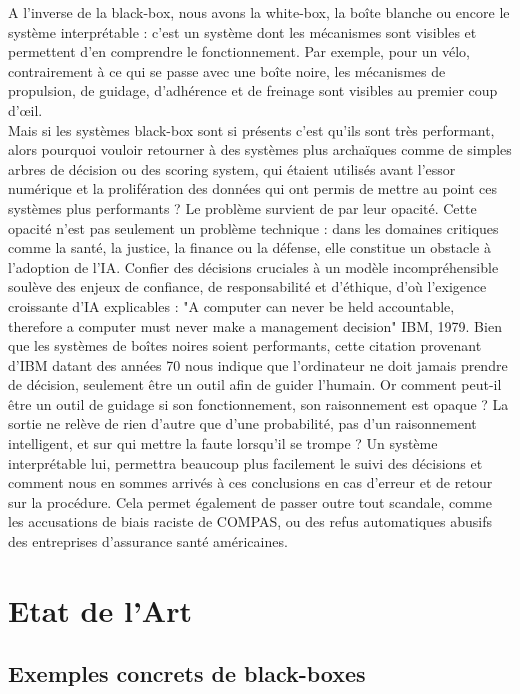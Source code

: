 \documentclass{article}
\begin{document}
A l’inverse de la black-box, nous avons la white-box, la boîte blanche ou encore le système interprétable : c’est un système dont les mécanismes sont visibles et permettent d'en comprendre le fonctionnement. Par exemple, pour un vélo, contrairement à ce qui se passe avec une boîte noire, les mécanismes de propulsion, de guidage, d'adhérence et de freinage sont visibles au premier coup d'œil.\\

Mais si les systèmes black-box sont si présents c’est qu’ils sont très performant, alors pourquoi vouloir retourner à des systèmes plus archaïques comme de simples arbres de décision ou des scoring system, qui étaient utilisés avant l'essor numérique et la prolifération des données qui ont permis de mettre au point ces systèmes plus performants ? Le problème survient de par leur opacité. Cette opacité n’est pas seulement un problème technique : dans les domaines critiques comme la santé, la justice, la finance ou la défense, elle constitue un obstacle à l’adoption de l’IA. Confier des décisions cruciales à un modèle incompréhensible soulève des enjeux de confiance, de responsabilité et d’éthique, d’où l’exigence croissante d’IA explicables : "A computer can never be held accountable, therefore a computer must never make a management decision" IBM, 1979. Bien que les systèmes de boîtes noires soient performants, cette citation provenant d’IBM datant des années 70 nous indique que l’ordinateur ne doit jamais prendre de décision, seulement être un outil afin de guider l’humain. Or comment peut-il être un outil de guidage si son fonctionnement, son raisonnement est opaque ? La sortie ne relève de rien d’autre que d’une probabilité, pas d’un raisonnement intelligent, et sur qui mettre la faute lorsqu’il se trompe ? Un système interprétable lui, permettra beaucoup plus facilement le suivi des décisions et comment nous en sommes arrivés à ces conclusions en cas d’erreur et de retour sur la procédure. Cela permet également de passer outre tout scandale, comme les accusations de biais raciste de COMPAS, ou des refus automatiques abusifs des entreprises d’assurance santé américaines.

\clearpage

\section{Etat de l'Art}

\subsection{Exemples concrets de black-boxes}
\end{document}
